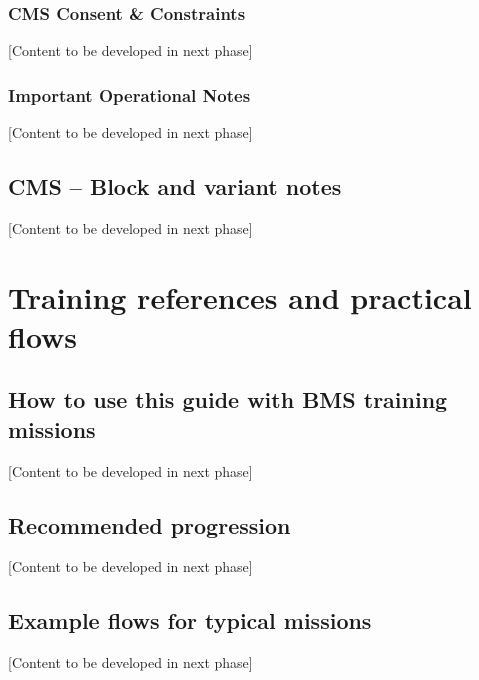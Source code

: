 \documentclass[11pt,a4paper]{article}
\begin{document}
\subsubsection{CMS Consent \& Constraints}

[Content to be developed in next phase]

\subsubsection{Important Operational Notes}

[Content to be developed in next phase]

\subsection{CMS -- Block and variant notes}

[Content to be developed in next phase]


\section{Training references and practical flows}

\subsection{How to use this guide with BMS training missions}

[Content to be developed in next phase]

\subsection{Recommended progression}

[Content to be developed in next phase]

\subsection{Example flows for typical missions}

[Content to be developed in next phase]

\end{document}
